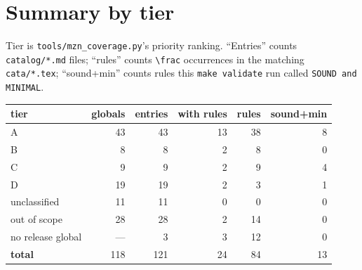 \documentclass[10pt,a4paper]{article}
\begin{document}
\section{Summary by tier}
Tier is \texttt{tools/mzn\_coverage.py}'s priority ranking. ``Entries'' counts \texttt{catalog/*.md} files; ``rules'' counts \texttt{\textbackslash{}frac} occurrences in the matching \texttt{cata/*.tex}; ``sound+min'' counts rules this \texttt{make validate} run called \texttt{SOUND and MINIMAL}.
\begin{longtable}{@{}lrrrrr@{}}
\hline
tier & globals & entries & with rules & rules & sound+min \\
\hline\endhead
A & 43 & 43 & 13 & 38 & 8 \\
B & 8 & 8 & 2 & 8 & 0 \\
C & 9 & 9 & 2 & 9 & 4 \\
D & 19 & 19 & 2 & 3 & 1 \\
unclassified & 11 & 11 & 0 & 0 & 0 \\
out of scope & 28 & 28 & 2 & 14 & 0 \\
\hline
no release global & --- & 3 & 3 & 12 & 0 \\
\hline
\textbf{total} & 118 & 121 & 24 & 84 & 13 \\
\hline
\end{longtable}
\end{document}
